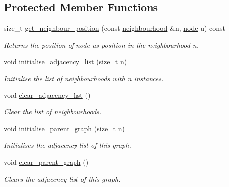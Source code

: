 \subsection*{Protected Member Functions}
\begin{DoxyCompactItemize}
\item 
size\+\_\+t \hyperlink{classlgraph_1_1utils_1_1xxgraph_aac7ef2134cad9529869f1334de7892d9}{get\+\_\+neighbour\+\_\+position} (const \hyperlink{namespacelgraph_1_1utils_a0f2ef47028a466d26841709e705390ac}{neighbourhood} \&n, \hyperlink{namespacelgraph_1_1utils_a7bd66ede3805ef121bc2835bd48de0cf}{node} u) const 
\begin{DoxyCompactList}\small\item\em Returns the position of node {\itshape u\textquotesingle{}s} position in the neighbourhood {\itshape n}. \end{DoxyCompactList}\item 
void \hyperlink{classlgraph_1_1utils_1_1xxgraph_a2201aaff5e9ffa29a9b3abfde705dd46}{initialise\+\_\+adjacency\+\_\+list} (size\+\_\+t n)\hypertarget{classlgraph_1_1utils_1_1xxgraph_a2201aaff5e9ffa29a9b3abfde705dd46}{}\label{classlgraph_1_1utils_1_1xxgraph_a2201aaff5e9ffa29a9b3abfde705dd46}

\begin{DoxyCompactList}\small\item\em Initialise the list of neighbourhoods with {\itshape n} instances. \end{DoxyCompactList}\item 
void \hyperlink{classlgraph_1_1utils_1_1xxgraph_a6523402d0ec66918b95de23d2bee38fc}{clear\+\_\+adjacency\+\_\+list} ()\hypertarget{classlgraph_1_1utils_1_1xxgraph_a6523402d0ec66918b95de23d2bee38fc}{}\label{classlgraph_1_1utils_1_1xxgraph_a6523402d0ec66918b95de23d2bee38fc}

\begin{DoxyCompactList}\small\item\em Clear the list of neighbourhoods. \end{DoxyCompactList}\item 
void \hyperlink{classlgraph_1_1utils_1_1xxgraph_abd983125be7f2f2b9c812326a4a39e6d}{initialise\+\_\+parent\+\_\+graph} (size\+\_\+t n)
\begin{DoxyCompactList}\small\item\em Initialises the adjacency list of this graph. \end{DoxyCompactList}\item 
void \hyperlink{classlgraph_1_1utils_1_1xxgraph_a8d213a8dfe716d344dd51d1bd37c0e2c}{clear\+\_\+parent\+\_\+graph} ()
\begin{DoxyCompactList}\small\item\em Clears the adjacency list of this graph. \end{DoxyCompactList}\end{DoxyCompactItemize}
